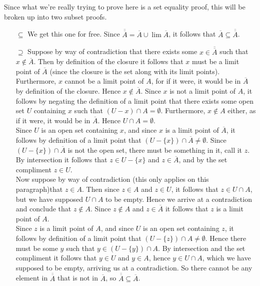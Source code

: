 \documentclass{article}
\theoremstyle{definition}
\begin{document}
 Since what we're really trying to prove here is a set equality proof, this will be broken up into two subset proofs.
\begin{itemize}
    \item[$\subseteq$] We get this one for free. Since $\overline{\overline{A}} = \overline{A} \cup \lim{\overline{A}}$, it follows that $\overline{A}\subseteq \overline{\overline{A}}$.
    
    \item[$\supseteq$] Suppose by way of contradiction that there exists some $x\in \overline{\overline{A}}$ such that $x\not\in \overline{A}$. Then by definition of the closure it follows that $x$ must be a limit point of $\overline{A}$ (since the closure is the set along with its limit points).\\
    
    Furthermore, $x$ cannot be a limit point of $A$, for if it were, it would be in $\overline{A}$ by definition of the closure. Hence $x\not\in \overline{A}$. Since $x$ is not a limit point of $A$, it follows by negating the definition of a limit point that there exists some open set $U$ containing $x$ such that $(U-{x})\cap A = \emptyset$. Furthermore, $x\not\in A$ either, as if it were, it would be in $\overline{A}$. Hence $U\cap A = \emptyset$.\\
    
    Since $U$ is an open set containing $x$, and since $x$ is a limit point of $\overline{A}$, it follows by definition of a limit point that $(U-\{x\})\cap \overline{A}\ne \emptyset$. Since $(U-\{x\})\cap \overline{A}$ is not the open set, there must be something in it, call it $z$. By intersection it follows that $z\in U-\{x\}$ and $z\in \overline{A}$, and by the set compliment $z\in U$.\\
    
    Now suppose by way of contradiction (this only applies on this paragraph)that $z\in A$. Then since $z\in A$ and $z\in U$, it follows that $z\in U\cap A$, but we have supposed $U\cap A$ to be empty. Hence we arrive at a contradiction and conclude that $z\not\in A$. Since $z\not\in A$ and $z\in \overline{A}$ it follows that $z$ is a limit point of $A$.\\
    
    Since $z$ is a limit point of $A$, and since $U$ is an open set containing $z$, it follows by definition of a limit point that $(U-\{z\})\cap A \ne \emptyset$. Hence there must be some $y$ such that $y\in (U-\{y\})\cap A$. By intersection and the set compliment it follows that $y\in U$ and $y\in A$, hence $y\in U\cap A$, which we have supposed to be empty, arriving us at a contradiction. So there cannot be any element in $\overline{\overline{A}}$ that is not in $\overline{A}$, so $\overline{\overline{A}}\subseteq \overline{A}$.
\end{itemize}
\end{document}
